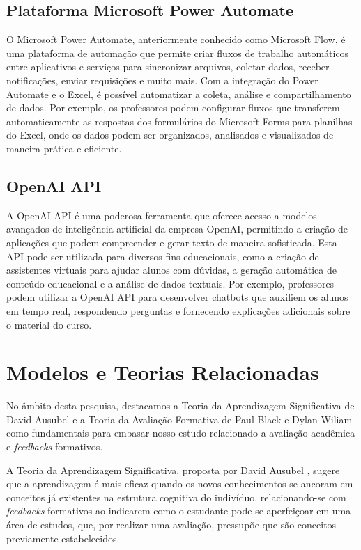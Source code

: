 \subsection{Plataforma Microsoft Power Automate}    

O Microsoft Power Automate, anteriormente conhecido como Microsoft Flow, é uma plataforma de automação que permite criar fluxos de trabalho automáticos entre aplicativos e serviços para sincronizar arquivos, coletar dados, receber notificações, enviar requisições e muito mais. Com a integração do Power Automate e o Excel, é possível automatizar a coleta, análise e compartilhamento de dados. Por exemplo, os professores podem configurar fluxos que transferem automaticamente as respostas dos formulários do Microsoft Forms para planilhas do Excel, onde os dados podem ser organizados, analisados e visualizados de maneira prática e eficiente.

\subsection{OpenAI API}

A OpenAI API é uma poderosa ferramenta que oferece acesso a modelos avançados de inteligência artificial da empresa OpenAI, permitindo a criação de aplicações que podem compreender e gerar texto de maneira sofisticada. Esta API pode ser utilizada para diversos fins educacionais, como a criação de assistentes virtuais para ajudar alunos com dúvidas, a geração automática de conteúdo educacional e a análise de dados textuais. Por exemplo, professores podem utilizar a OpenAI API para desenvolver chatbots que auxiliem os alunos em tempo real, respondendo perguntas e fornecendo explicações adicionais sobre o material do curso.

\section{Modelos e Teorias Relacionadas}

No âmbito desta pesquisa, destacamos a Teoria da Aprendizagem Significativa de David Ausubel \cite{teorias} e a Teoria da Avaliação Formativa de Paul Black e Dylan Wiliam \cite{domingos2006} como fundamentais para embasar nosso estudo relacionado a avaliação acadêmica e \textit{feedbacks} formativos.

A Teoria da Aprendizagem Significativa, proposta por David Ausubel \cite{teorias}, sugere que a aprendizagem é mais eficaz quando os novos conhecimentos se ancoram em conceitos já existentes na estrutura cognitiva do indivíduo, relacionando-se com \textit{feedbacks} formativos ao indicarem como o estudante pode se aperfeiçoar em uma área de estudos, que, por realizar uma avaliação, pressupõe que são conceitos previamente estabelecidos.

